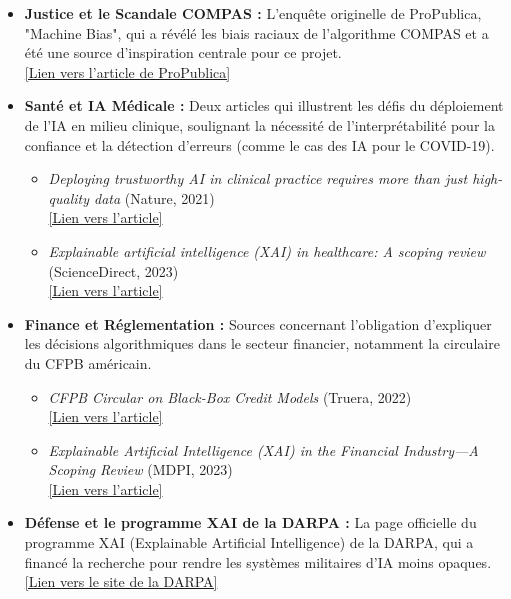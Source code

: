\documentclass{article}
\begin{document}
\begin{itemize}
    \item \textbf{Justice et le Scandale COMPAS :} L'enquête originelle de ProPublica, "Machine Bias", qui a révélé les biais raciaux de l'algorithme COMPAS et a été une source d'inspiration centrale pour ce projet. \\
    \href{https://www.propublica.org/article/machine-bias-risk-assessments-in-criminal-sentencing}{[Lien vers l'article de ProPublica]}

    \item \textbf{Santé et IA Médicale :} Deux articles qui illustrent les défis du déploiement de l'IA en milieu clinique, soulignant la nécessité de l'interprétabilité pour la confiance et la détection d'erreurs (comme le cas des IA pour le COVID-19).
    \begin{itemize}
        \item \textit{Deploying trustworthy AI in clinical practice requires more than just high-quality data} (Nature, 2021) \\
        \href{https://www.nature.com/articles/s42256-021-00338-7}{[Lien vers l'article]}
        \item \textit{Explainable artificial intelligence (XAI) in healthcare: A scoping review} (ScienceDirect, 2023) \\
        \href{https://www.sciencedirect.com/science/article/pii/S0933365723001732}{[Lien vers l'article]}
    \end{itemize}

    \item \textbf{Finance et Réglementation :} Sources concernant l'obligation d'expliquer les décisions algorithmiques dans le secteur financier, notamment la circulaire du CFPB américain.
    \begin{itemize}
        \item \textit{CFPB Circular on Black-Box Credit Models} (Truera, 2022) \\
        \href{https://truera.com/ai-quality-education/ai-regulation/cfpb-circular-on-black-box-credit-models-five-considerations-for-lenders}{[Lien vers l'article]}
        \item \textit{Explainable Artificial Intelligence (XAI) in the Financial Industry—A Scoping Review} (MDPI, 2023) \\
        \href{https://www.mdpi.com/2673-2688/4/2/23}{[Lien vers l'article]}
    \end{itemize}

    \item \textbf{Défense et le programme XAI de la DARPA :} La page officielle du programme XAI (Explainable Artificial Intelligence) de la DARPA, qui a financé la recherche pour rendre les systèmes militaires d'IA moins opaques. \\
    \href{https://www.darpa.mil/program/explainable-artificial-intelligence}{[Lien vers le site de la DARPA]}
\end{itemize}
\end{document}
